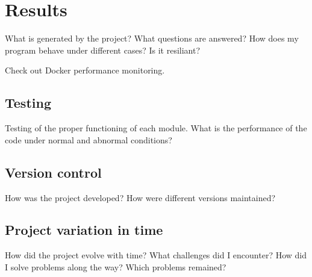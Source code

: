 \chapter{Results}
\label{ch:results}
What is generated by the project?
What questions are answered?
How does my program behave under different cases?
Is it resiliant?

Check out Docker performance monitoring.

\section{Testing}
Testing of the proper functioning of each module.
What is the performance of the code under normal and abnormal conditions?


\section{Version control}
How was the project developed?
How were different versions maintained?


\section{Project variation in time}
How did the project evolve with time?
What challenges did I encounter?
How did I solve problems along the way?
Which problems remained?